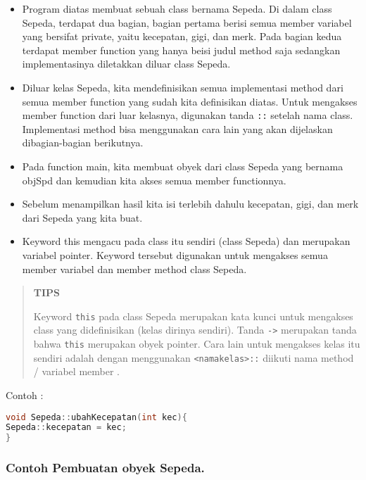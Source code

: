 \begin{itemize}

\item
  Program diatas membuat sebuah class bernama Sepeda. Di dalam class
  Sepeda, terdapat dua bagian, bagian pertama berisi semua member
  variabel yang bersifat private, yaitu kecepatan, gigi, dan merk. Pada
  bagian kedua terdapat member function yang hanya beisi judul method
  saja sedangkan implementasinya diletakkan diluar class Sepeda.
\item
  Diluar kelas Sepeda, kita mendefinisikan semua implementasi method
  dari semua member function yang sudah kita definisikan diatas. Untuk
  mengakses member function dari luar kelasnya, digunakan tanda
  \texttt{::} setelah nama class. Implementasi method bisa menggunakan
  cara lain yang akan dijelaskan dibagian-bagian berikutnya.
\item
  Pada function main, kita membuat obyek dari class Sepeda yang bernama
  objSpd dan kemudian kita akses semua member functionnya.
\item
  Sebelum menampilkan hasil kita isi terlebih dahulu kecepatan, gigi,
  dan merk dari Sepeda yang kita buat.
\item
  Keyword this mengacu pada class itu sendiri (class Sepeda) dan
  merupakan variabel pointer. Keyword tersebut digunakan untuk mengakses
  semua member variabel dan member method class Sepeda.
\end{itemize}
\begin{quotation}
{\LARGE {}} 	\textbf{TIPS} 
	
	Keyword
	\texttt{this} pada class Sepeda merupakan kata kunci untuk mengakses
	class yang didefinisikan (kelas dirinya sendiri). Tanda
	\texttt{-\textgreater{}} merupakan tanda bahwa \texttt{this} merupakan
	obyek pointer. Cara lain untuk mengakses kelas itu sendiri adalah dengan
	menggunakan \texttt{\textless{}namakelas\textgreater{}::} diikuti nama
	method / variabel member .
\end{quotation}
 
 
  

Contoh :

\begin{lstlisting}[language=c++, numbers=none]
void Sepeda::ubahKecepatan(int kec){
Sepeda::kecepatan = kec;
}
\end{lstlisting}

\subsubsection*{Contoh  Pembuatan obyek Sepeda.}

